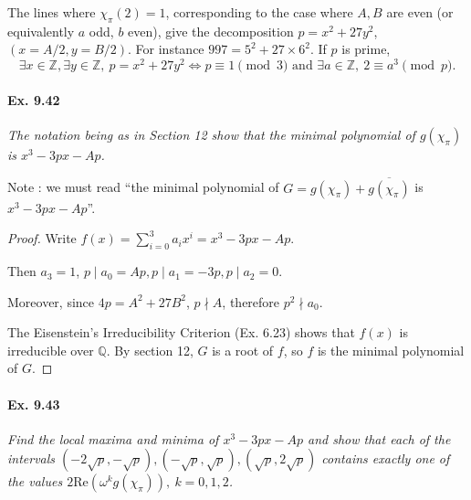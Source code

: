 \documentclass[11pt,a4paper]{article}
\newcommand{\Q}{\mathbb{Q}}
\newcommand{\Z}{\mathbb{Z}}
\begin{document}
The lines where $\chi_\pi(2) = 1$, corresponding to the case where $A,B$ are even (or equivalently $a$ odd, $b$ even), give the decomposition ${p = x^2 + 27 y^2}$, ${(x = A/2,y = B/2)}$. For instance $997 = 5^2 + 27\times 6^2$. If $p$ is prime,
$$\exists x\in \Z, \exists y \in \Z,\  p = x^2 + 27y^2 \iff p\equiv 1 \pmod 3 \text{ and } \exists a \in \Z,\ 2 \equiv a^3 \pmod p.$$
\paragraph{Ex. 9.42}

{\it The notation being as in Section 12 show that the minimal polynomial of $g(\chi_\pi)$ is $x^3 - 3px-Ap$.
}

Note : we must read ``the minimal polynomial of $G = g(\chi_\pi) + \overline{g(\chi_\pi)}$ is $x^3 - 3px-Ap$''.

\begin{proof}
Write $f(x) = \sum_{i=0}^3 a_i x^i = x^3 - 3px - Ap$.

Then $a_3 = 1$, $p \mid a_0 = Ap, p \mid a_1 = -3p, p\mid a_2 = 0$.

Moreover, since $4p = A^2 + 27 B^2$, $p\nmid A$, therefore $p^2 \nmid a_0$.

The Eisenstein's Irreducibility Criterion (Ex. 6.23) shows that $f(x)$ is irreducible over $\Q$. By section 12, $G$ is a root of $f$, so $f$ is the minimal polynomial of $G$.
\end{proof}


\paragraph{Ex. 9.43}

{\it Find the local maxima and minima of $x^3 - 3px -Ap$ and show that each of the intervals $(-2\sqrt{p}, - \sqrt{p}), (-\sqrt{p},\sqrt{p}), (\sqrt{p},2 \sqrt{p})$ contains exactly one of the values $2 \mathrm{Re}(\omega^k g(\chi_\pi)),\ k=0,1,2$.
}
\end{document}
